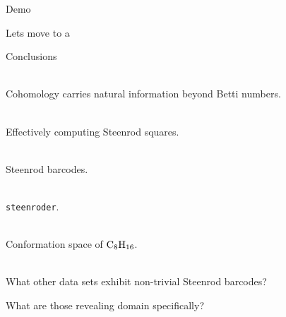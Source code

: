 
\begin{frame}[fragile]{Demo}

	Lets move to a 
\end{frame}

\begin{frame}{Conclusions}

	\pause
	 \\
	Cohomology carries natural information beyond Betti numbers.

	\medskip\pause
	 \\
	Effectively computing Steenrod squares.

	\medskip\pause
	 \\
	Steenrod barcodes.

	\medskip\pause
	 \\
	\texttt{steenroder}.

	\medskip\pause
	 \\
	Conformation space of $\mathrm{C}_8\mathrm{H}_{16}$.

	\medskip\pause
	 \\
	\pause
	What other data sets exhibit non-trivial Steenrod barcodes?

	\smallskip\pause
	What are those revealing domain specifically?
\end{frame}